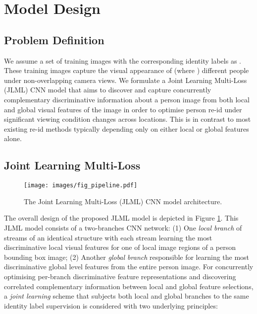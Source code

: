 \documentclass{article}
\begin{document}
\section{Model Design}

\subsection{Problem Definition}

We assume a set of  training images 
 with the corresponding 
identity labels as .
These training images capture the visual appearance of 
 (where ) different people 
under non-overlapping camera views.
We formulate a Joint Learning Multi-Loss (JLML) CNN model that 
aims to discover and capture concurrently
complementary discriminative information about a person image from
both local and global visual features of the image in order to
optimise person re-id under significant viewing 
condition changes across locations. 
This is in contrast to most existing re-id methods typically depending
only on either local or global features alone.


\subsection{Joint Learning Multi-Loss}
\label{sec:JLML_model}

\begin{figure} [h]
	\centering
	\texttt{[image: images/fig\_pipeline.pdf]}
	\vskip -0.1cm
	\caption{\footnotesize
		The Joint Learning Multi-Loss (JLML) CNN model architecture. 
}
	\label{fig:pipline}
\end{figure}

The overall design of the proposed JLML model is depicted in
Figure \ref{fig:pipline}. This JLML model consists of a two-branches CNN network:
(1) One {\em local branch} of  streams of an identical structure
with each stream learning the most discriminative local visual
features for one of  local image regions of a person bounding box image;
(2) Another {\em global branch} responsible for learning the most
discriminative global level features from the entire person image.
For concurrently optimising
per-branch discriminative feature representations and
discovering correlated complementary information between local and
global feature selections, a {\em joint learning} scheme that subjects
both local and global branches to the same identity label supervision
is considered with two underlying principles:
\end{document}

